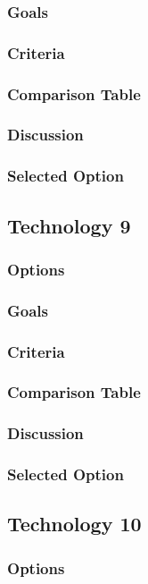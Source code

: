 \documentclass[10pt,draftclsnofoot,onecolumn]{IEEEtran}
\begin{document}
\subsubsection{Goals}
\subsubsection{Criteria}
\subsubsection{Comparison Table}
\subsubsection{Discussion}
\subsubsection{Selected Option}
\subsection{Technology 9}
\subsubsection{Options}
\subsubsection{Goals}
\subsubsection{Criteria}
\subsubsection{Comparison Table}
\subsubsection{Discussion}
\subsubsection{Selected Option}
\subsection{Technology 10}
\subsubsection{Options}
\end{document}
